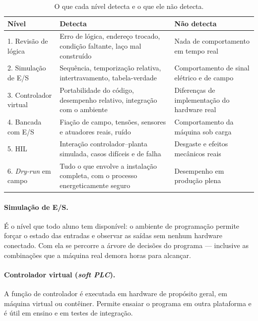 \begin{table}[H]
  \centering
  \caption{O que cada nível detecta e o que ele não detecta.}
  \label{tab:niveis-validacao}
  \begin{tabular}{p{3.6cm} p{5.4cm} p{5.4cm}}
    \toprule
    Nível & Detecta & Não detecta \\
    \midrule
    1. Revisão de lógica
      & Erro de lógica, endereço trocado, condição faltante, laço mal construído
      & Nada de comportamento em tempo real \\
    2. Simulação de E/S
      & Sequência, temporização relativa, intertravamento, tabela-verdade
      & Comportamento de sinal elétrico e de campo \\
    3. Controlador virtual
      & Portabilidade do código, desempenho relativo, integração com o ambiente
      & Diferenças de implementação do hardware real \\
    4. Bancada com E/S
      & Fiação de campo, tensões, sensores e atuadores reais, ruído
      & Comportamento da máquina sob carga \\
    5. HIL
      & Interação controlador--planta simulada, casos difíceis e de falha
      & Desgaste e efeitos mecânicos reais \\
    6. \emph{Dry-run} em campo
      & Tudo o que envolve a instalação completa, com o processo energeticamente seguro
      & Desempenho em produção plena \\
    \bottomrule
  \end{tabular}
\end{table}

\paragraph{Simulação de E/S.} É o nível que todo aluno tem disponível: o ambiente de programação
permite forçar o estado das entradas e observar as saídas sem nenhum hardware conectado. Com ela se
percorre a árvore de decisões do programa --- inclusive as combinações que a máquina real demora
horas para alcançar.

\paragraph{Controlador virtual (\emph{soft PLC}).} A função de controlador é executada em hardware de
propósito geral, em máquina virtual ou contêiner. Permite ensaiar o programa em outra plataforma e é
útil em ensino e em testes de integração.


